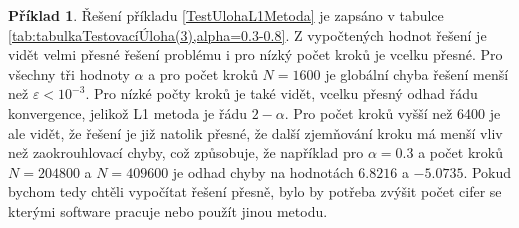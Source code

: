 \documentclass[a4paper,12pt,twoside]{article}
\theoremstyle{definition}
\newtheorem{prikl}[veta]{Příklad}
\theoremstyle{remark}
\numberwithin{equation}{section}
\numberwithin{table}{section}
\numberwithin{figure}{section}
\begin{document}
\begin{prikl}
Řešení příkladu \ref{TestUlohaL1Metoda} je zapsáno v tabulce \ref{tab:tabulkaTestovacíÚloha(3),alpha=0.3-0.8}. Z vypočtených hodnot řešení je vidět velmi přesné řešení problému i pro nízký počet kroků je vcelku přesné. Pro všechny tři hodnoty $\alpha$ a pro počet kroků $N = 1600$ je globální chyba řešení menší než $\varepsilon < 10^{-3}$. Pro nízké počty kroků je také vidět, vcelku přesný odhad řádu konvergence, jelikož L1 metoda je řádu $2 - \alpha$. Pro počet kroků vyšší než 6400 je ale vidět, že řešení je již natolik přesné, že další zjemňování kroku má menší vliv než zaokrouhlovací chyby, což způsobuje, že například pro $\alpha = 0.3$ a počet kroků $N = 204800$ a $N = 409600$ je odhad chyby na hodnotách $6.8216$ a $-5.0735$. Pokud bychom tedy chtěli vypočítat řešení přesně, bylo by potřeba zvýšit počet cifer se kterými software pracuje nebo použít jinou metodu. %


\end{prikl}
\end{document}
